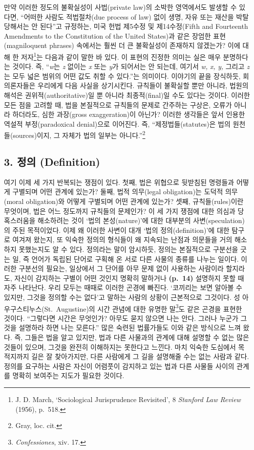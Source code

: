 만약 이러한 정도의 불확실성이 사법(private law)의 소박한 영역에서도
발생할 수 있다면, “어떠한 사람도 적법절차(due process of law) 없이
생명, 자유 또는 재산을 박탈당해서는 안 된다”고 규정하는, 미국 헌법
제5수정 및 제14수정(Fifth and Fourteenth Amendments to the Constitution
of the United States)과 같은 장엄한 표현(magniloquent phrases) 속에서는
훨씬 더 큰 불확실성이 존재하지 않겠는가? 이에 대해 한 저자\footnote{J.
  D. March, `Sociological Jurisprudence Revisited', 8 \emph{Stanford Law
  Review} (1956), p.~518.}는 다음과 같이 말한 바 있다. 이 표현의 진정한
의미는 실은 매우 분명하다는 것이다. 즉, “\emph{w}는 \emph{z} 없이는
\emph{x} 또는 \emph{y}가 되어서는 안 되는데, 여기서 \emph{w, x, y,}
그리고 \emph{z}는 모두 넓은 범위의 어떤 값도 취할 수 있다.”는 의미이다.
이야기의 끝을 장식하듯, 회의론자들은 우리에게 다음 사실을 상기시킨다.
규칙들이 불확실할 뿐만 아니라, 법원의 해석은 권위적(authoritative)일 뿐
아니라 최종적(final)일 수도 있다는 것이다. 이러한 모든 점을 고려할 때,
법을 본질적으로 규칙들의 문제로 간주하는 구상은, 오류가 아니라 하더라도,
심한 과장(gross exaggeration)이 아닌가? 이러한 생각들은 앞서 인용한
역설적 부정(paradoxical denial)으로 이어진다. 즉, “제정법들(statutes)은
법의 원천들(sources)이지, 그 자체가 법의 일부는 아니다.”\footnote{Gray,
  loc. cit.}

\subsection{3. 정의 (Definition)}\label{uxc815uxc758-definition}

여기 이제 세 가지 반복되는 쟁점이 있다. 첫째, 법은 위협으로 뒷받침된
명령들과 어떻게 구별되며 어떤 관계에 있는가? 둘째, 법적 의무(legal
obligation)는 도덕적 의무(moral obligation)와 어떻게 구별되며 어떤
관계에 있는가? 셋째, 규칙들(rules)이란 무엇이며, 법은 어느 정도까지
규칙들의 문제인가? 이 세 가지 쟁점에 대한 의심과 당혹스러움을 해소하려는
것이 ‘법의 본성(nature)’에 대한 대부분의 사변(speculation)의 주된
목적이었다. 이제 왜 이러한 사변이 대개 ‘법의 정의(definition)’에 대한
탐구로 여겨져 왔는지, 또 익숙한 정의의 형식들이 왜 지속되는 난점과
의문들을 거의 해소하지 못했는지도 알 수 있다. 정의라는 말이 암시하듯,
정의는 본질적으로 구분선을 긋는 일, 즉 언어가 독립된 단어로 구획해 온
서로 다른 사물의 종류를 나누는 일이다. 이러한 구분선의 필요는, 일상에서
그 단어를 아무 문제 없이 사용하는 사람이라 할지라도, 자신이 감지하는
구별이 어떤 것인지 명확히 말하거나 \textbf{(p.~14)} 설명하지 못할 때
자주 나타난다. 우리 모두는 때때로 이러한 곤경에 빠진다. ‘코끼리는 보면
알아볼 수 있지만, 그것을 정의할 수는 없다’고 말하는 사람의 상황이
근본적으로 그것이다. 성 아우구스티누스(St.~Augustine)의 시간 관념에 대한
유명한 말\footnote{\emph{Confessiones}, xiv. 17.}도 같은 곤경을 표현한
것이다. “그렇다면 시간은 무엇인가? 아무도 묻지 않으면 나는 안다. 그러나
누군가 그것을 설명하라 하면 나는 모른다.” 많은 숙련된 법률가들도 이와
같은 방식으로 느껴 왔다. 즉, 그들은 법을 알고 있지만, 법과 다른 사물과의
관계에 대해 설명할 수 없는 많은 것들이 있으며, 그것을 완전히 이해하지는
못한다고 느낀다. 마치 익숙한 도심에서 목적지까지 길은 잘 찾아가지만,
다른 사람에게 그 길을 설명해줄 수는 없는 사람과 같다. 정의를 요구하는
사람은 자신이 어렴풋이 감지하고 있는 법과 다른 사물들 사이의 관계를
명확히 보여주는 지도가 필요한 것이다.

